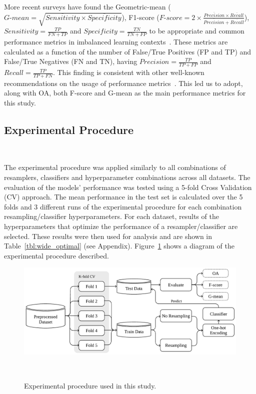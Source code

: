 \documentclass[parskip=full]{scrartcl}
\begin{document}
More recent surveys have found the Geometric-mean ($\textit{G-mean} =
\sqrt{\overline{Sensitivity} \times \overline{Specificity}}$), F1-score
($\textit{F-score}=2\times\frac{\overline{Precision} \times
\overline{Recall}}{\overline{Precision} + \overline{Recall}}$), $Sensitivity =
\frac{TP}{FN+TP}$ and $Specificity = \frac{TN}{TN + FP}$ to be appropriate and
common performance metrics in imbalanced learning
contexts~\cite{rout2018handling}. These metrics are calculated as a function
of the number of False/True Positives (FP and TP) and False/True Negatives (FN
and TN), having $Precision = \frac{TP}{TP+FP}$ and $Recall =
\frac{TP}{TP+FN}$. This finding is consistent with other well-known
recommendations on the usage of performance metrics~\cite{jeni2013facing,
japkowicz2013assessment}.  This led us to adopt, along with OA, both F-score
and G-mean as the main performance metrics for this study. 

\subsection{Experimental Procedure}~\label{sec:experimental_procedure}

The experimental procedure was applied similarly to all combinations of
resamplers, classifiers and hyperparameter combinations across all datasets.
The evaluation of the models' performance was tested using a 5-fold Cross
Validation (CV) approach. The mean performance in the test set is calculated
over the 5 folds and 3 different runs of the experimental procedure for each
combination resampling/classifier hyperparameters. For each dataset, results
of the hyperparameters that optimize the performance of a resampler/classifier
are selected. These results were then used for analysis and are shown in
Table~\ref{tbl:wide_optimal} (see Appendix).
Figure~\ref{fig:experimental_procedure} shows a diagram of the experimental
procedure described.

\begin{figure}
	\centering
	\includegraphics[width=.8\linewidth]{../analysis/experimental_procedure}
    \caption{Experimental procedure used in this study.
    }~\label{fig:experimental_procedure}
\end{figure}
\end{document}
